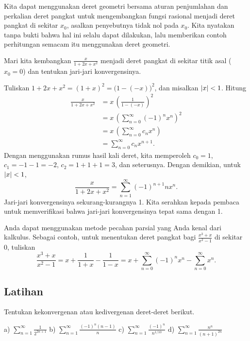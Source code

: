 Kita dapat menggunakan deret geometri bersama aturan penjumlahan dan
perkalian deret pangkat untuk mengembangkan fungsi rasional menjadi deret
pangkat di sekitar $x_0$,
asalkan penyebutnya tidak nol pada $x_0$.  Kita nyatakan tanpa
bukti bahwa hal ini selalu dapat dilakukan, lalu memberikan contoh
perhitungan semacam itu menggunakan deret geometri.

\begin{example}
Mari kita kembangkan $\frac{x}{1+2x+x^2}$ menjadi deret pangkat di sekitar titik asal ($x_0 = 0$) dan
tentukan jari-jari konvergensinya.

Tuliskan $1+2x+x^2 = {(1+x)}^2 = {\bigl(1-(-x)\bigr)}^2$, dan misalkan
$\lvert {x} \rvert < 1$.  Hitung
\begin{equation*}
\begin{split}
\frac{x}{1+2x+x^2}
&=
x \,
{\left(
\frac{1}{1-(-x)}
\right)}^2
\\
&=
x \,
{\left( 
\sum_{n=0}^\infty {(-1)}^n x^n 
\right)}^2
\\
&=
x \,
\left(
\sum_{n=0}^\infty c_n x^n 
\right)
\\
&=
\sum_{n=0}^\infty c_n x^{n+1} .
\end{split}
\end{equation*}
Dengan menggunakan rumus hasil kali deret,
kita memperoleh $c_0 = 1$, $c_1 = -1 -1 = -2$, $c_2 = 1+1+1 = 3$, dan seterusnya.
Dengan demikian, untuk $\lvert {x} \rvert < 1$,
\begin{equation*}
\frac{x}{1+2x+x^2}
=
\sum_{n=1}^\infty {(-1)}^{n+1} n x^n .
\end{equation*}
Jari-jari konvergensinya sekurang-kurangnya 1.  Kita serahkan kepada pembaca untuk
memverifikasi bahwa jari-jari konvergensinya tepat sama dengan 1.
\end{example}

Anda dapat menggunakan metode pecahan parsial yang Anda kenal dari kalkulus.
Sebagai contoh, untuk menentukan deret pangkat bagi $\frac{x^3+x}{x^2-1}$ di sekitar 0, tuliskan
\begin{equation*}
\frac{x^3+x}{x^2-1}
=
x + \frac{1}{1+x} - \frac{1}{1-x}
=
x + \sum_{n=0}^\infty {(-1)}^n x^n - \sum_{n=0}^\infty x^n .
\end{equation*}

\subsection{Latihan}

\begin{exercise}
Tentukan kekonvergenan atau kedivergenan deret-deret berikut.

\medskip

\noindent
a)
$\displaystyle \sum_{n=1}^\infty \frac{1}{2^{2n+1}}$
\qquad
b)
$\displaystyle \sum_{n=1}^\infty \frac{{(-1)}^{n}(n-1)}{n}$
\qquad
c)
$\displaystyle \sum_{n=1}^\infty \frac{{(-1)}^n}{n^{1/10}}$
\qquad
d)
$\displaystyle \sum_{n=1}^\infty \frac{n^n}{{(n+1)}^{2n}}$
\end{exercise}

